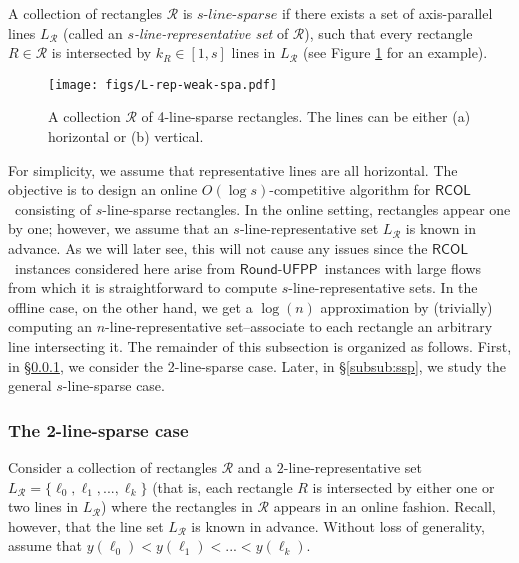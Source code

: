 \documentclass[a4paper,UKenglish]{lipics-v2016}
\newcommand{\rufpp}{\mbox{$\mathsf{Round}$-$\mathsf{UFPP}$}}
\newcommand{\rcol}{\mbox{$\mathsf{RCOL}$}}
\theoremstyle{plain}
\newcommand{\cR}{\mathcal{R}}
\begin{document}
\begin{definition}
A collection of rectangles $\cR$ is $s$-$line$-$sparse$ if there exists a set of axis-parallel lines $L_{\cR}$ (called an {\em $s$-line-representative set} of $\cR$), such that every rectangle $R\in\cR$ is intersected by $k_R\in [1,s]$ lines in $L_{\cR}$ (see Figure \ref{fig:sparsity} for an example).
\end{definition}

\begin{figure}[htb]
\begin{center}
\texttt{[image: figs/L-rep-weak-spa.pdf]}
\caption{A collection $\cR$ of 4-line-sparse rectangles. The lines can be either (a) horizontal or (b) vertical.
\label{fig:sparsity}
}
\end{center}
\end{figure}


For simplicity, we assume that representative lines are all horizontal. The objective is to design an online $O(\log s)$-competitive algorithm for \rcol\ consisting of $s$-line-sparse rectangles. In the online setting, rectangles appear one by one; however, we assume that an $s$-line-representative set $L_{\cR}$ is known in advance. As we will later see, this will not cause any issues since the \rcol\ instances considered here arise from \rufpp\ instances with large flows from which it is straightforward to compute $s$-line-representative sets. In the offline case, on the other hand, we get a $\log(n)$ approximation by (trivially) computing an $n$-line-representative set--associate to each rectangle an arbitrary line intersecting it. The remainder of this subsection is organized as follows. First, in \S\ref{subsub:2sp}, we consider the 2-line-sparse case. Later, in \S\ref{subsub:ssp}, we study the general $s$-line-sparse case.

\subsubsection{The 2-line-sparse case}\label{subsub:2sp}
Consider a collection of rectangles $\cR$ and a $2$-line-representative set $L_{\cR}=\{\ell_0,\ell_1,...,\ell_k\}$ (that is, each rectangle $R$ is intersected by either one or two lines in $L_{\cR}$) where the rectangles in $\cR$ appears in an online fashion. Recall, however, that the line set $L_{\cR}$ is known in advance. Without loss of generality, assume that $y(\ell_0)<y(\ell_1)<...<y(\ell_k)$.
\end{document}
